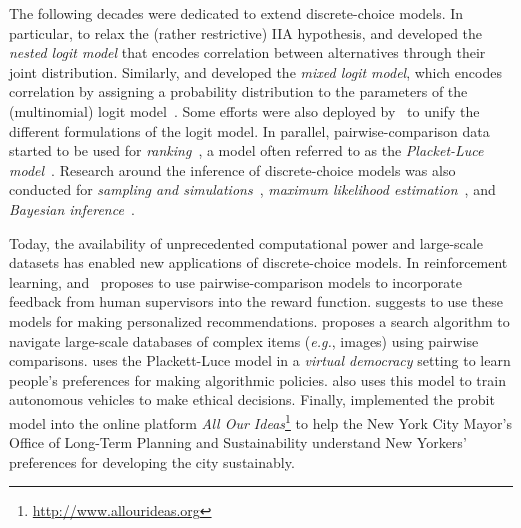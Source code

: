 The following decades were dedicated to extend discrete-choice models.
In particular, to relax the (rather restrictive) IIA hypothesis, \citet{ben1973structure} and \citet{williams1977formation} developed the \emph{nested logit model} that encodes correlation between alternatives through their joint distribution.
Similarly, \citet{boyd1980effect} and \citet{cardell1980measuring} developed the \emph{mixed logit model}, which encodes correlation by assigning a probability distribution to the parameters of the (multinomial) logit model~\citep{hensher2003mixed}.
Some efforts were also deployed by~\citet{yellot1977relationship} to unify the different formulations of the logit model.
In parallel, pairwise-comparison data started to be used for \emph{ranking}~\citep{ford1957solution,buehlmann1963pairwise,plackett1975analysis,wauthier2013efficient,negahban2017rank}, a model often referred to as the \emph{Placket-Luce model}~\citep{hensher2003mixed}.
Research around the inference of discrete-choice models was also conducted for \emph{sampling and simulations}~\citep{manski1981alternative,cosslett1981efficient}, \emph{maximum likelihood estimation}~\citep{hastie1998classification,hunter2004mm,maystre2015fast,vojnovic2016parameter}, and \emph{Bayesian inference}~\citep{guiver2009bayesian,caron2012efficient,houlsby2012collaborative}.

Today, the availability of unprecedented computational power and large-scale datasets has enabled new applications of discrete-choice models.
In reinforcement learning, \citet{sadigh2017active} and~\citet{christiano2017deep} proposes to use pairwise-comparison models to incorporate feedback from human supervisors into the reward function.
\citet{ammar2015ranked} suggests to use these models for making personalized recommendations.
\citet{chumbalov2020scalable} proposes a search algorithm to navigate large-scale databases of complex items (\textit{e.g.}, images) using pairwise comparisons.
\citet{lee2019webuildai} uses the Plackett-Luce model in a \emph{virtual democracy} setting to learn people's preferences for making algorithmic policies.
\citet{noothigattu2018voting} also uses this model to train autonomous vehicles to make ethical decisions.
Finally, \citet{salganik2015wiki} implemented the probit model into the online platform \emph{All Our Ideas}\footnote{\href{http://www.allourideas.org/planyc_example?guides=true}{http://www.allourideas.org}} to help the New York City Mayor’s Office of Long-Term Planning and Sustainability understand New Yorkers' preferences for developing the city sustainably.

